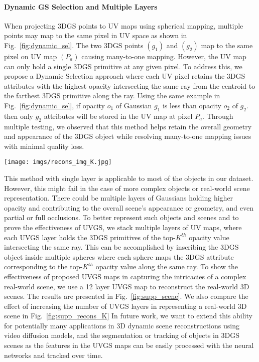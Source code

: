 \paragraph{Dynamic GS Selection and Multiple Layers}
When projecting 3DGS points to UV maps using spherical mapping, multiple points may map to the same pixel in UV space as shown in Fig.~\ref{fig:dynamic_sel}. 
The two 3DGS points $( g_1 )$ and $( g_2 )$ map to the same pixel on UV map $( P_a )$ causing many-to-one mapping. 
However, the UV map can only hold a single 3DGS primitive at any given pixel.
To address this, we propose a Dynamic Selection approach where each UV pixel retains the 3DGS attributes with the highest opacity intersecting the same ray from the centroid to the farthest 3DGS primitive along the ray.
Using the same example in Fig.~\ref{fig:dynamic_sel}, if opacity $o_1$ of Gaussian $g_1$ is less than opacity $o_2$ of $g_2$. then only $g_2$ attributes will be stored in the UV map at pixel $P_a$. 
Through multiple testing, we observed that this method helps retain the overall geometry and appearance of the 3DGS object while resolving many-to-one mapping issues with minimal quality loss.

\begin{figure*}[t]
\centering
\texttt{[image: imgs/recons\_img\_K.jpg]} 
\caption{
Reconstruction of a real-world scene for different K values. Smaller K results in many-to-one issue, hence lacking details.
}
\label{fig:supp_recons_K}
\end{figure*}




This method with single layer is applicable to most of the objects in our dataset. However, this might fail in the case of more complex objects or real-world scene representation. There could be multiple layers of Gaussians holding higher opacity and contributing to the overall scene's appearance or geometry, and even partial or full occlusions.
To better represent such objects and scenes and to prove the effectiveness of UVGS, we stack multiple layers of UV maps, where each UVGS layer holds the 3DGS primitives of the top-$K^{th}$ opacity value intersecting the same ray. 
This can be accomplished by inscribing the 3DGS object inside multiple spheres where each sphere maps the 3DGS attribute corresponding to the top-$K^{th}$ opacity value along the same ray. 
To show the effectiveness of proposed UVGS maps in capturing the intricacies of a complex real-world scene, we use a 12 layer UVGS map to reconstruct the real-world 3D scenes. The results are presented in Fig.~\ref{fig:supp_scene}. We also compare the effect of increasing the number of UVGS layers in representing a real-world 3D scene in Fig.~\ref{fig:supp_recons_K}
In future work, we want to extend this ability for potentially many applications in 3D dynamic scene reconstructions using video diffusion models, and the segmentation or tracking of objects in 3DGS scenes as the features in the UVGS maps can be easily processed with the neural networks and tracked over time. 

